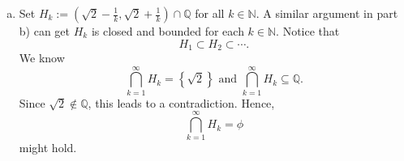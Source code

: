 \begin{Exercise}
\begin{enumerate}[a)]
\begin{proof}
\begin{itemize}
If $(\sqrt{2}, \sqrt{3})\cap \mathbb{Q}$ is compact, then there exists $N\in\mathbb{N}$ such that 
$$
(\sqrt{2}, \sqrt{3})\cap \mathbb{Q} \subseteq \bigcup_{k=1}^{N} B_{r_k}(x_k).
$$
But the open balls are disjoint, so there is a point $x\in(\sqrt{2}, \sqrt{3})\cap \mathbb{Q}$ such that
$$
x\notin\bigcup_{k=1}^{N} B_{r_k}(x_k).
$$
We conclude $(\sqrt{2}, \sqrt{3})\cap \mathbb{Q}$ is not compact.
\end{itemize}
\end{proof}

\item
\begin{solution}
Set $H_k := \left( \sqrt{2}-\frac{1}{k}, \sqrt{2}+\frac{1}{k} \right) \cap \mathbb{Q}$ for all $k\in\mathbb{N}$. A similar argument in part b) can get $H_k$ is closed and bounded for each $k\in\mathbb{N}$. Notice that
$$
H_1 \subset H_2 \subset \cdots.
$$
We know
$$
\bigcap_{k=1}^{\infty} H_k = \left\{\sqrt{2}\right\} \text{ and } \bigcap_{k=1}^{\infty} H_k \subseteq \mathbb{Q}.
$$
Since $\sqrt{2} \notin \mathbb{Q}$, this leads to a contradiction. Hence,
$$
\bigcap_{k=1}^{\infty} H_k = \phi
$$
might hold.
\end{solution}
\end{enumerate}
\end{Exercise}